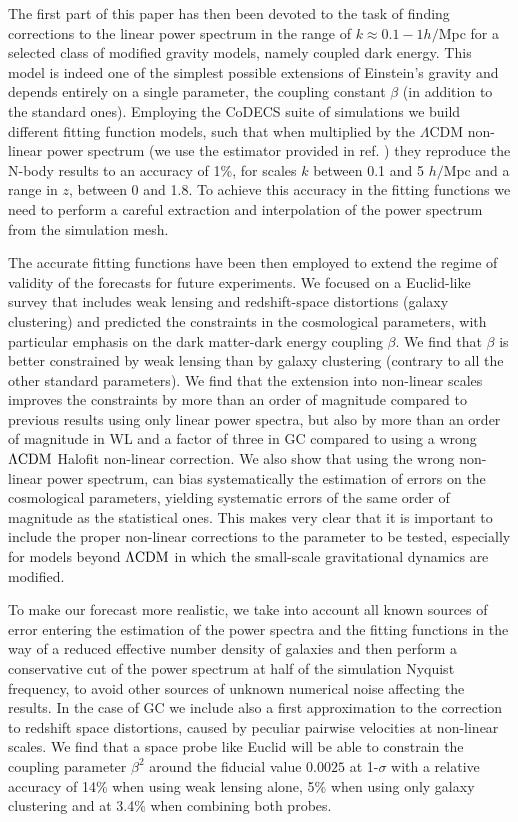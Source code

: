The first part of this paper has then been devoted to the task of
finding corrections to the linear power spectrum in the range of $k\approx0.1-1h/$Mpc
for a selected class of modified gravity models, namely coupled dark
energy. This model is indeed one of the simplest possible extensions
of Einstein's gravity and depends entirely on a single parameter,
the coupling constant $\beta$ (in addition to the standard ones).
Employing the CoDECS suite of simulations \citep{baldi_codecs_2012}
we build different fitting function models, such that when multiplied
by the $\Lambda$CDM non-linear power spectrum (we use the estimator
provided in ref. \citep{heitmann_coyote_2014} ) they reproduce the
N-body results to an accuracy of 1\%, for scales $k$ between 0.1
and 5 $h/\mbox{Mpc}$ and a range in $z$, between 0 and 1.8. To achieve
this accuracy in the fitting functions we need to perform a careful
extraction and interpolation of the power spectrum from the simulation
mesh.

The accurate fitting functions have been then employed to extend the
regime of validity of the forecasts for future experiments. We focused
on a Euclid-like survey that includes weak lensing and redshift-space
distortions (galaxy clustering) and predicted the constraints in the
cosmological parameters, with particular emphasis on the dark matter-dark
energy coupling $\beta$. We find that $\beta$ is better constrained
by weak lensing than by galaxy clustering (contrary to all the other
standard parameters). We find that the extension into non-linear scales
improves the constraints by more than an order of magnitude compared
to previous results using only linear power spectra, but also by more
than an order of magnitude in WL and a factor of three in GC compared
to using a wrong $\Lambda\mathrm{CDM}$ Halofit non-linear correction. We also show
that using the wrong non-linear power spectrum, can bias systematically
the estimation of errors on the cosmological parameters, yielding
systematic errors of the same order of magnitude as the statistical
ones. This makes very clear that it is important to include the proper
non-linear corrections to the parameter to be tested, especially for
models beyond $\Lambda\mathrm{CDM}$ in which the small-scale gravitational dynamics
are modified.

To make our forecast more realistic, we take into account all known
sources of error entering the estimation of the power spectra and
the fitting functions in the way of a reduced effective number density
of galaxies and then perform a conservative cut of the power spectrum
at half of the simulation Nyquist frequency, to avoid other sources
of unknown numerical noise affecting the results. In the case of GC
we include also a first approximation to the correction to redshift
space distortions, caused by peculiar pairwise velocities at non-linear
scales. We find that a space probe like Euclid will be able to constrain
the coupling parameter $\beta^{2}$ around the fiducial value $0.0025$
at 1-$\sigma$ with a relative accuracy of 14\% when using weak lensing
alone, 5\% when using only galaxy clustering and at 3.4\% when combining
both probes.

